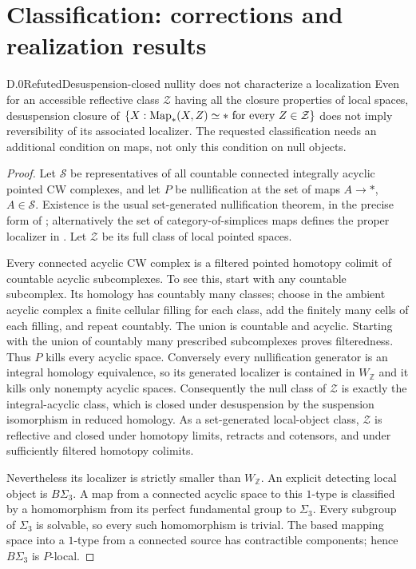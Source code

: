 \section{Classification: corrections and realization results}

\begin{claim}{D.0}{Refuted}{Desuspension-closed nullity does not characterize a localization}
Even for an accessible reflective class $\mathcal Z$ having all the closure properties of local spaces, desuspension closure of
$\{X:\operatorname{Map}_*(X,Z)\simeq *\text{ for every }Z\in\mathcal Z\}$
does not imply reversibility of its associated localizer. The requested classification needs an additional condition on maps, not only this condition on null objects.
\end{claim}
\begin{proof}
Let $\mathcal S$ be representatives of all countable connected integrally acyclic pointed CW complexes, and let $P$ be nullification at the set of maps $A\to *$, $A\in\mathcal S$. Existence is the usual set-generated nullification theorem, in the precise form of \citet[Theorem 1.1]{Bousfield1996ULP}; alternatively the set of category-of-simplices maps defines the proper localizer in \citet[Theorem 6.1.11]{FGHCisinski2006}. Let $\mathcal Z$ be its full class of local pointed spaces.

Every connected acyclic CW complex is a filtered pointed homotopy colimit of countable acyclic subcomplexes. To see this, start with any countable subcomplex. Its homology has countably many classes; choose in the ambient acyclic complex a finite cellular filling for each class, add the finitely many cells of each filling, and repeat countably. The union is countable and acyclic. Starting with the union of countably many prescribed subcomplexes proves filteredness. Thus $P$ kills every acyclic space. Conversely every nullification generator is an integral homology equivalence, so its generated localizer is contained in $W_{\mathbb Z}$ and it kills only nonempty acyclic spaces. Consequently the null class of $\mathcal Z$ is exactly the integral-acyclic class, which is closed under desuspension by the suspension isomorphism in reduced homology. As a set-generated local-object class, $\mathcal Z$ is reflective and closed under homotopy limits, retracts and cotensors, and under sufficiently filtered homotopy colimits.

Nevertheless its localizer is strictly smaller than $W_{\mathbb Z}$. An explicit detecting local object is $B\Sigma_3$. A map from a connected acyclic space to this $1$-type is classified by a homomorphism from its perfect fundamental group to $\Sigma_3$. Every subgroup of $\Sigma_3$ is solvable, so every such homomorphism is trivial. The based mapping space into a $1$-type from a connected source has contractible components; hence $B\Sigma_3$ is $P$-local.


\end{proof}
